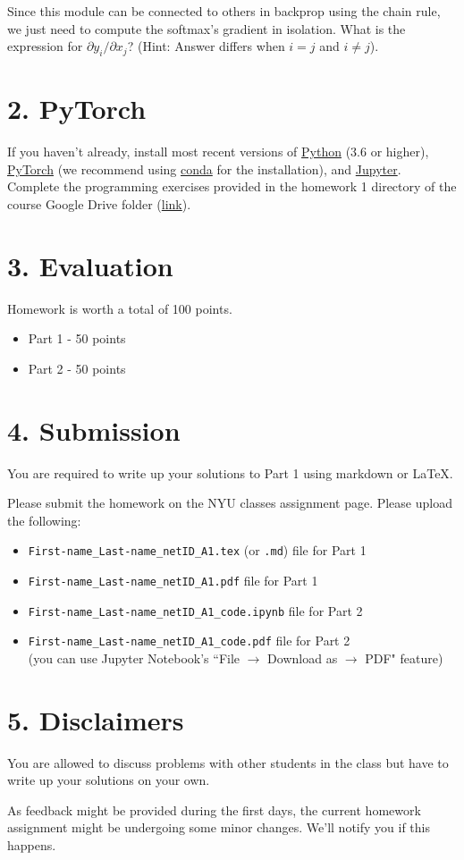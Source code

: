 \documentclass[12pt,letterpaper]{article}
\begin{document}
\noindent Since this module can be connected to others in backprop using the chain rule, we just need to compute the softmax's gradient in isolation. What is the expression for $\partial y_i / \partial x_j$?
(Hint: Answer differs when $i = j$ and $i \neq j$).
\newpage
\section*{2. PyTorch}
If you haven't already, install most recent versions of 
\href{https://www.python.org/downloads/}{Python} (3.6 or higher), \href{https://pytorch.org/}{PyTorch} (we recommend using \href{https://conda.io/projects/conda/en/latest/user-guide/install/index.html}{conda} for the installation), and \href{https://jupyter.org/install.html}{Jupyter}.\\

\noindent Complete the programming exercises provided in the homework 1 directory of the course Google Drive folder (\href{https://drive.google.com/drive/u/2/folders/1CQ0Jiti5st01OOuSfFljyoe_z-366y4y}{link}).

\section*{3. Evaluation}
Homework is worth a total of 100 points.
\begin{itemize}
    \item Part 1 - 50 points
    \item Part 2 - 50 points
\end{itemize}

\section*{4. Submission}
You are required to write up your solutions to Part 1 using markdown or \LaTeX.

Please submit the homework on the NYU classes assignment page. Please upload the following:
\begin{itemize}
    \item \texttt{First-name\_Last-name\_netID\_A1.tex} (or \texttt{.md}) file for Part 1
    \item \texttt{First-name\_Last-name\_netID\_A1.pdf} file for Part 1
    \item \texttt{First-name\_Last-name\_netID\_A1\_code.ipynb} file for Part 2
    \item 
    \texttt{First-name\_Last-name\_netID\_A1\_code.pdf} file for Part 2\\
    (you can use Jupyter Notebook's ``File $\to$ Download as $\to$ PDF" feature)
\end{itemize}

\section*{5. Disclaimers}
You are allowed to discuss problems with other students in the class but have to write up your solutions on your own. 

As feedback might be provided during the first days, the current homework assignment might be undergoing some minor changes. We'll notify you if this happens.
\end{document}
